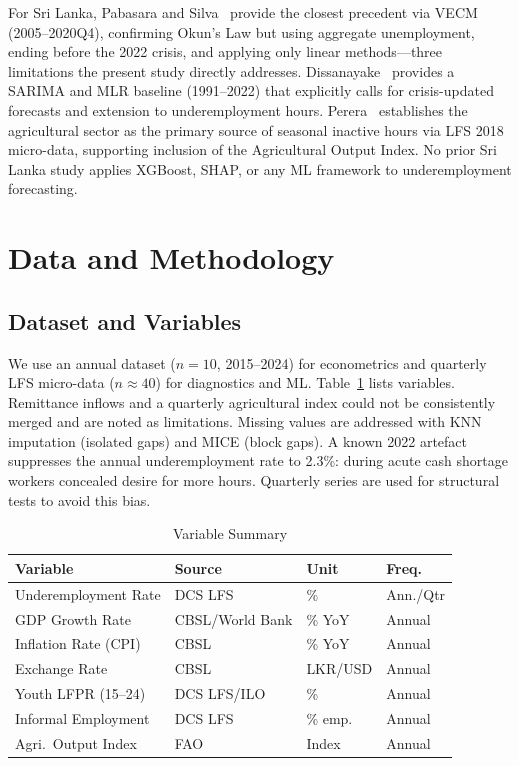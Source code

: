 \documentclass[sigconf]{acmart}
\begin{document}
For Sri Lanka, Pabasara and Silva~\cite{pabasara2025impact} provide the closest precedent via VECM (2005--2020Q4), confirming Okun's Law but using aggregate unemployment, ending before the 2022 crisis, and applying only linear methods---three limitations the present study directly addresses. Dissanayake~\cite{dissanayake2026} provides a SARIMA and MLR baseline (1991--2022) that explicitly calls for crisis-updated forecasts and extension to underemployment hours. Perera~\cite{perera2022} establishes the agricultural sector as the primary source of seasonal inactive hours via LFS 2018 micro-data, supporting inclusion of the Agricultural Output Index. No prior Sri Lanka study applies XGBoost, SHAP, or any ML framework to underemployment forecasting.

\section{Data and Methodology}

\subsection{Dataset and Variables}

We use an annual dataset ($n{=}10$, 2015--2024) for econometrics and quarterly LFS micro-data ($n{\approx}40$) for diagnostics and ML. Table~\ref{tab:variables} lists variables. Remittance inflows and a quarterly agricultural index could not be consistently merged and are noted as limitations. Missing values are addressed with KNN imputation (isolated gaps) and MICE (block gaps). A known 2022 artefact suppresses the annual underemployment rate to 2.3\%: during acute cash shortage workers concealed desire for more hours. Quarterly series are used for structural tests to avoid this bias.

\begin{table}[h]
\caption{Variable Summary}
\label{tab:variables}
\setlength{\tabcolsep}{3.5pt}
\footnotesize
\begin{tabular}{llll}
\toprule
\textbf{Variable} & \textbf{Source} & \textbf{Unit} & \textbf{Freq.}\\
\midrule
Underemployment Rate    & DCS LFS         & \%       & Ann./Qtr \\
GDP Growth Rate         & CBSL/World Bank & \% YoY   & Annual \\
Inflation Rate (CPI)    & CBSL            & \% YoY   & Annual \\
Exchange Rate           & CBSL            & LKR/USD  & Annual \\
Youth LFPR (15--24)     & DCS LFS/ILO     & \%       & Annual \\
Informal Employment     & DCS LFS         & \% emp.  & Annual \\
Agri.\ Output Index     & FAO             & Index    & Annual \\
\bottomrule
\end{tabular}
\end{table}
\end{document}
